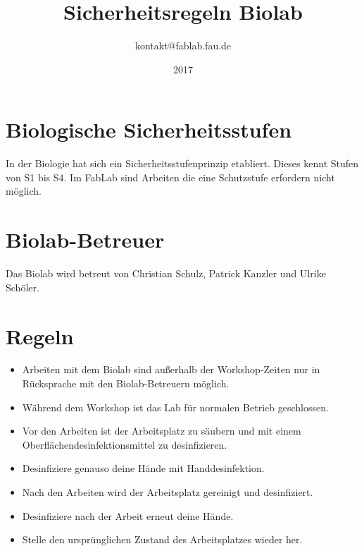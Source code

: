 \documentclass[13pt]{\basedir/fablab-document}
\date{2017}
\author{kontakt@fablab.fau.de}
\title{Sicherheitsregeln Biolab}
\begin{document}
\maketitle

\vbox{\vspace{1cm}}


\section{Biologische Sicherheitsstufen}
In der Biologie hat sich ein Sicherheitsstufenprinzip etabliert.
Dieses kennt Stufen von S1 bis S4.
Im FabLab sind Arbeiten die eine Schutzstufe erfordern nicht möglich.

\section{Biolab-Betreuer}
Das Biolab wird betreut von Christian Schulz, Patrick Kanzler und Ulrike Schöler.

\section{Regeln}
\begin{itemize}
\item Arbeiten mit dem Biolab sind außerhalb der Workshop-Zeiten nur in Rücksprache mit den Biolab-Betreuern möglich.
\item Während dem Workshop ist das Lab für normalen Betrieb geschlossen.
\item Vor den Arbeiten ist der Arbeitsplatz zu säubern und mit einem Oberflächendesinfektionsmittel zu desinfizieren.
\item Desinfiziere genauso deine Hände mit Handdesinfektion.
\item Nach den Arbeiten wird der Arbeitsplatz gereinigt und desinfiziert.
\item Desinfiziere nach der Arbeit erneut deine Hände.
\item Stelle den ursprünglichen Zustand des Arbeitsplatzes wieder her.
\end{itemize}

\end{document}
